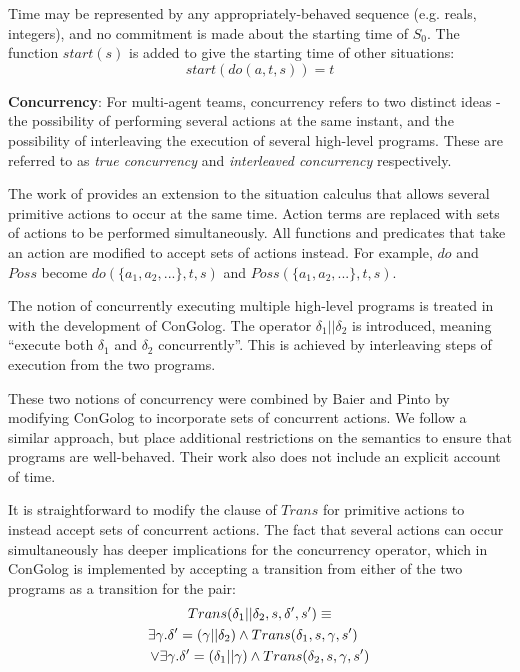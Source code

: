 \documentclass[letterpaper]{article}
\begin{document}
Time may be represented by any appropriately-behaved sequence (e.g. reals,
integers), and no commitment is made about the starting time of $S_0$.
The function $start(s)$ is added to give the starting time of other situations:
\begin{equation}
\label{eqn:sit_start}
start(do(a,t,s))=t
\end{equation}

\textbf{Concurrency}: 
For multi-agent teams, concurrency refers to two distinct ideas -
the possibility of performing several actions at the same instant,
and the possibility of interleaving the execution of several high-level
programs. These are referred to as \emph{true concurrency} and \emph{interleaved
concurrency} respectively.

The work of \cite{lin92sc_conc,reiter96sc_nat_conc} provides an extension
to the situation calculus that allows several primitive actions to
occur at the same time. Action terms are replaced with sets of actions
to be performed simultaneously. All functions and predicates that
take an action are modified to accept sets of actions instead. For
example, $do$ and $Poss$ become $do(\{ a_{1},a_{2},...\},t,s)$
and $Poss(\{ a_{1},a_{2},...\},t,s)$.

The notion of concurrently executing multiple high-level programs
is treated in \cite{giacomo00congolog} with the development of ConGolog.
The operator $\delta_{1}||\delta_{2}$ is introduced, meaning ``execute
both $\delta_{1}$ and $\delta_{2}$ concurrently''. This is achieved
by interleaving steps of execution from the two programs.

These two notions of concurrency were combined by Baier and Pinto
\cite{pinto99tcongolog} by modifying ConGolog to incorporate sets
of concurrent actions. We follow a similar approach, but place
additional restrictions on the semantics to ensure that programs are
well-behaved. Their work also does not include an explicit account
of time.

It is straightforward to modify the clause of $Trans$
for primitive actions to instead accept sets of concurrent actions.
The fact that several actions can occur simultaneously has
deeper implications for the concurrency operator, which in ConGolog
is implemented by accepting a transition from either of the two programs
as a transition for the pair:
\begin{multline}
\label{eqn:con_trans_orig}
Trans(\delta_{1}||\delta_{2},s,\delta',s')\equiv\\
\shoveright{\exists\gamma.\delta'=(\gamma||\delta_{2})\wedge Trans(\delta_{1},s,\gamma,s')}\\
\vee\exists\gamma.\delta'=(\delta_{1}||\gamma)\wedge Trans(\delta_{2},s,\gamma,s')
\end{multline}
\end{document}
